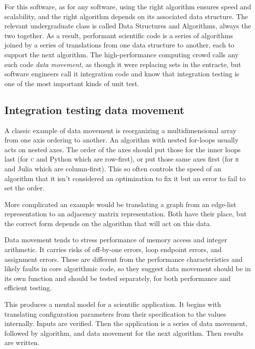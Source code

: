 \documentclass[fleqn,10pt]{olplainarticle}
\newcommand{\rlang}{\textsc{r}\xspace}
\begin{document}
For this software, as for any software, using the right algorithm
ensures speed and scalability, and the right algorithm depends on
its associated data structure. The relevant undergraduate class
is called Data Structures and Algorithms, always the two together.
As a result, performant scientific code is a series of algorithms
joined by a series of translations from one data structure to
another, each to support the next algorithm. The high-performance
computing crowd calls any such code \emph{data movement,} as though
it were replacing sets in the entracte,
but software engineers call it integration code and know that
integration testing is one of the most important kinds of unit test.


\subsection{Integration testing data movement}

A classic example of data movement is reorganizing a multidimensional
array from one axis ordering to another. An algorithm with nested
for-loops usually acts on nested axes. The order of the axes should
put those for the inner loops last (for \textsc{c} and Python which are row-first), or put those
same axes first (for \rlang and Julia which are column-first). This so
often controls the speed of an algorithm that it isn't considered an 
optimization to fix it but an error to fail to set the order.

More complicated an example would be translating a graph from
an edge-list representation to an adjacency matrix representation.
Both have their place, but the correct form depends on the
algorithm that will act on this data.

Data movement tends to stress performance of memory access
and integer arithmetic. It carries risks of off-by-one errors,
loop endpoint errors, and assignment errors. These are different
from the performance characteristics and likely faults in core
algorithmic code, so they suggest data movement should be in its
own function and should be tested separately, for both performance
and efficient testing.

This produces a mental model for a scientific application. It begins
with translating configuration parameters from their specification
to the values internally. Inputs are verified. Then the application
is a series of data movement, followed by algorithm, and data movement
for the next algorithm. Then results are written.
\end{document}
